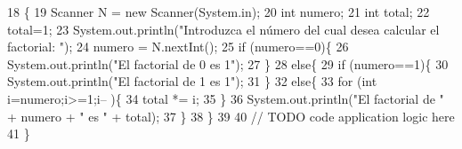 \begin{DoxyCode}
18                                            \{
19         Scanner N = \textcolor{keyword}{new} Scanner(System.in);
20         \textcolor{keywordtype}{int} numero;
21         \textcolor{keywordtype}{int} total;
22         total=1;
23         System.out.println(\textcolor{stringliteral}{"Introduzca el número del cual desea calcular el factorial: "});
24         numero = N.nextInt();
25         \textcolor{keywordflow}{if} (numero==0)\{
26             System.out.println(\textcolor{stringliteral}{"El factorial de 0 es 1"});
27         \}
28         \textcolor{keywordflow}{else}\{
29             \textcolor{keywordflow}{if} (numero==1)\{
30                 System.out.println(\textcolor{stringliteral}{"El factorial de 1 es 1"});
31             \}
32             \textcolor{keywordflow}{else}\{
33                 \textcolor{keywordflow}{for} (\textcolor{keywordtype}{int} i=numero;i>=1;i-- )\{
34                     total *= i;
35                 \}
36         System.out.println(\textcolor{stringliteral}{"El factorial de "} + numero + \textcolor{stringliteral}{" es "} + total);
37             \}
38         \}
39 
40         \textcolor{comment}{// TODO code application logic here}
41     \}
\end{DoxyCode}
